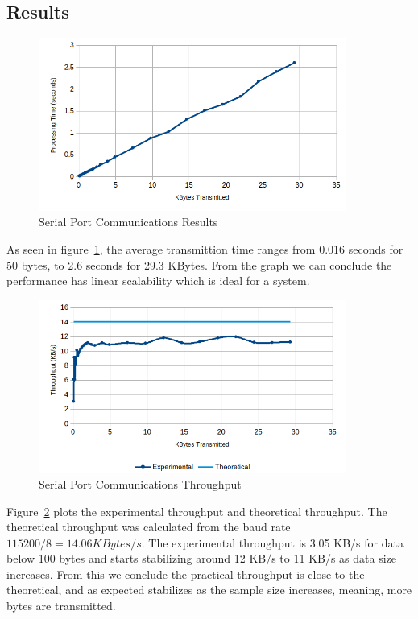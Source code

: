 \subsection{Results}\label{chap:evaluation:comms:results}

\begin{figure}[h!]
	\centering
	\includegraphics[width=0.9\textwidth]{./Images/comms-performance.png}
	\caption{Serial Port Communications Results}
	\label{fig:performance:comms}
\end{figure}

As seen in figure~\ref{fig:performance:comms}, the average transmittion time ranges from 0.016 seconds for 50 bytes, to 2.6 seconds for 29.3 KBytes.
From the graph we can conclude the performance has linear scalability which is ideal for a system.

\begin{figure}[h!]
	\centering
	\includegraphics[width=0.9\textwidth]{./Images/comms-tput.png}
	\caption{Serial Port Communications Throughput}
	\label{fig:performance:tput}
\end{figure}

Figure~\ref{fig:performance:tput} plots the experimental throughput and theoretical throughput. The theoretical throughput was calculated from the baud rate \(115200/8 = 14.06 KBytes/s\).
The experimental throughput is 3.05 KB/s for data below 100 bytes and starts stabilizing around 12 KB/s to 11 KB/s as data size increases.
From this we conclude the practical throughput is close to the theoretical, and as expected stabilizes as the sample size increases, meaning, more bytes are transmitted.

